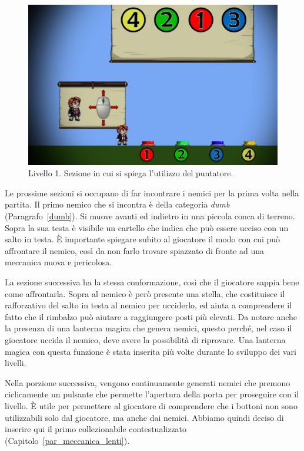 \begin{figure}%
	\centering
	\includegraphics[width= 0.75\columnwidth]{images/gameDesign/45_mouse.jpg}
	\caption{Livello 1. Sezione in cui si spiega l'utilizzo del puntatore.}
	\label{fig:livello1_puntatore}
\end{figure}

Le prossime sezioni si occupano di far incontrare i nemici per la prima volta nella partita. Il primo nemico che si incontra è della categoria \textit{dumb} (Paragrafo~\ref{dumb}). Si muove avanti ed indietro in una piccola conca di terreno. Sopra la sua testa è visibile un cartello che indica che può essere ucciso con un salto in testa. È importante spiegare subito al giocatore il modo con cui può affrontare il nemico, così da non farlo trovare spiazzato di fronte ad una meccanica nuova e pericolosa.

La sezione successiva ha la stessa conformazione, così che il giocatore sappia bene come affrontarla. Sopra al nemico è però presente una stella, che costituisce il rafforzativo del salto in testa al nemico per ucciderlo, ed aiuta a comprendere il fatto che il rimbalzo può aiutare a raggiungere posti più elevati. Da notare anche la presenza di una lanterna magica che genera nemici, questo perché, nel caso il giocatore uccida il nemico, deve avere la possibilità di riprovare. Una lanterna magica con questa funzione è stata inserita più volte durante lo sviluppo dei vari livelli.

Nella porzione successiva, vengono continuamente generati nemici che premono ciclicamente un pulsante che permette l’apertura della porta per proseguire con il livello. È utile per permettere al giocatore di comprendere che i bottoni non sono utilizzabili solo dal giocatore, ma anche dai nemici.
Abbiamo quindi deciso di inserire qui il primo collezionabile contestualizzato (Capitolo~\ref{par_meccanica_lenti}). 

